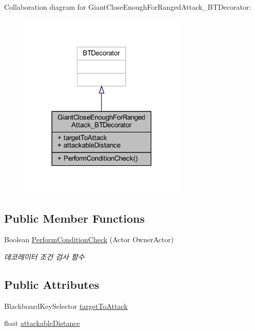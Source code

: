 Collaboration diagram for Giant\+Close\+Enough\+For\+Ranged\+Attack\+\_\+\+B\+T\+Decorator\+:
\nopagebreak
\begin{figure}[H]
\begin{center}
\leavevmode
\includegraphics[width=225pt]{class_giant_close_enough_for_ranged_attack___b_t_decorator__coll__graph}
\end{center}
\end{figure}
\subsection*{Public Member Functions}
\begin{DoxyCompactItemize}
\item 
Boolean \hyperlink{class_giant_close_enough_for_ranged_attack___b_t_decorator_a44e018d77f40f5aa61a4304b8e8cf15e}{Perform\+Condition\+Check} (Actor Owner\+Actor)
\begin{DoxyCompactList}\small\item\em 데코레이터 조건 검사 함수 \end{DoxyCompactList}\end{DoxyCompactItemize}
\subsection*{Public Attributes}
\begin{DoxyCompactItemize}
\item 
Blackboard\+Key\+Selector \hyperlink{class_giant_close_enough_for_ranged_attack___b_t_decorator_a1cc248f03397ce0e086ac9b16bd732e1}{target\+To\+Attack}
\item 
float \hyperlink{class_giant_close_enough_for_ranged_attack___b_t_decorator_a994ad90e6d00df363f635eee1fcf2146}{attackable\+Distance}
\end{DoxyCompactItemize}


